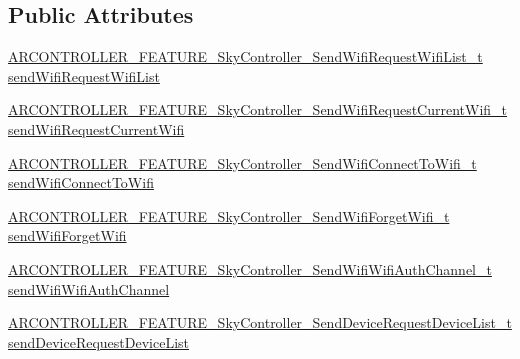 \subsection*{Public Attributes}
\begin{DoxyCompactItemize}
\item 
\hyperlink{_a_r_c_o_n_t_r_o_l_l_e_r___feature_8h_a085ff563e0e662e36b553ece6d0196a0}{A\+R\+C\+O\+N\+T\+R\+O\+L\+L\+E\+R\+\_\+\+F\+E\+A\+T\+U\+R\+E\+\_\+\+Sky\+Controller\+\_\+\+Send\+Wifi\+Request\+Wifi\+List\+\_\+t} \hyperlink{struct_a_r_c_o_n_t_r_o_l_l_e_r___f_e_a_t_u_r_e___sky_controller__t_a7ca9da558fb683e16e51a4eb993cf039}{send\+Wifi\+Request\+Wifi\+List}
\item 
\hyperlink{_a_r_c_o_n_t_r_o_l_l_e_r___feature_8h_a5370399e2989746d9c7bcc5fc5167e82}{A\+R\+C\+O\+N\+T\+R\+O\+L\+L\+E\+R\+\_\+\+F\+E\+A\+T\+U\+R\+E\+\_\+\+Sky\+Controller\+\_\+\+Send\+Wifi\+Request\+Current\+Wifi\+\_\+t} \hyperlink{struct_a_r_c_o_n_t_r_o_l_l_e_r___f_e_a_t_u_r_e___sky_controller__t_af5d09d5afe0f9884adbbb732611bac0a}{send\+Wifi\+Request\+Current\+Wifi}
\item 
\hyperlink{_a_r_c_o_n_t_r_o_l_l_e_r___feature_8h_a04dfaa9b41cce7042f2877e2419b153a}{A\+R\+C\+O\+N\+T\+R\+O\+L\+L\+E\+R\+\_\+\+F\+E\+A\+T\+U\+R\+E\+\_\+\+Sky\+Controller\+\_\+\+Send\+Wifi\+Connect\+To\+Wifi\+\_\+t} \hyperlink{struct_a_r_c_o_n_t_r_o_l_l_e_r___f_e_a_t_u_r_e___sky_controller__t_a273f55bfaa9e39cdceb5b3a51807508a}{send\+Wifi\+Connect\+To\+Wifi}
\item 
\hyperlink{_a_r_c_o_n_t_r_o_l_l_e_r___feature_8h_a7c3ac0da3cf5037b49d830ce2991d7b8}{A\+R\+C\+O\+N\+T\+R\+O\+L\+L\+E\+R\+\_\+\+F\+E\+A\+T\+U\+R\+E\+\_\+\+Sky\+Controller\+\_\+\+Send\+Wifi\+Forget\+Wifi\+\_\+t} \hyperlink{struct_a_r_c_o_n_t_r_o_l_l_e_r___f_e_a_t_u_r_e___sky_controller__t_a908eff5c514a9b97f83018965ada9c24}{send\+Wifi\+Forget\+Wifi}
\item 
\hyperlink{_a_r_c_o_n_t_r_o_l_l_e_r___feature_8h_ac5953e469c1cf7a1e48100622d706dce}{A\+R\+C\+O\+N\+T\+R\+O\+L\+L\+E\+R\+\_\+\+F\+E\+A\+T\+U\+R\+E\+\_\+\+Sky\+Controller\+\_\+\+Send\+Wifi\+Wifi\+Auth\+Channel\+\_\+t} \hyperlink{struct_a_r_c_o_n_t_r_o_l_l_e_r___f_e_a_t_u_r_e___sky_controller__t_a181059a95baee3110341b1e23d74a936}{send\+Wifi\+Wifi\+Auth\+Channel}
\item 
\hyperlink{_a_r_c_o_n_t_r_o_l_l_e_r___feature_8h_ad1c095fd73c14756e11793cc9a4ecd2e}{A\+R\+C\+O\+N\+T\+R\+O\+L\+L\+E\+R\+\_\+\+F\+E\+A\+T\+U\+R\+E\+\_\+\+Sky\+Controller\+\_\+\+Send\+Device\+Request\+Device\+List\+\_\+t} \hyperlink{struct_a_r_c_o_n_t_r_o_l_l_e_r___f_e_a_t_u_r_e___sky_controller__t_ab04fbf2dcd87d843da03bfca8b9675c3}{send\+Device\+Request\+Device\+List}

\end{DoxyCompactItemize}
